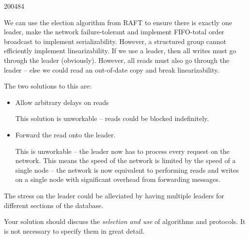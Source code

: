 \documentclass[10pt,\jkfside,a4paper]{article}
\begin{document}
\begin{examquestion}{2004}{8}{4}
\begin{enumerate}[label=(\alph*)]
\begin{enumerate}[label=(\roman*)]
We can use the election algorithm from RAFT to ensure there is
exactly one leader, make the network failure-tolerant and implement
FIFO-total order broadcast to implement serializability. However, a structured
group cannot efficiently implement linearizability. If we use a leader, then
all writes must go through the leader (obviously). However, all reads must
also go through the leader -- else we could read an out-of-date copy and
break linearizability.

The two solutions to this are:

\begin{itemize}

\item Allow arbitrary delays on reads

This solution is unworkable -- reads could be blocked indefinitely.

\item Forward the read onto the leader.

This is unworkable -- the leader now has to process every request on the
network. This means the speed of the network is limited by the speed of a
single node -- the network is now equivalent to performing reads and writes
on a single node with significant overhead from forwarding messages.

\end{itemize}

The stress on the leader could be alleviated by having multiple leaders for
different sections of the database.

\end{enumerate}

Your solution should discuss the \textit{selection and use} of algorithms and
protocols. It is not necessary to specify them in great detail.

\end{enumerate}

\end{examquestion}
\end{document}
